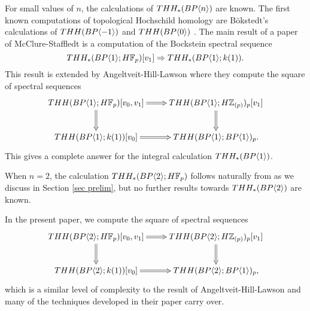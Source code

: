 For small values of $n$, the calculations of $THH_*(BP\langle n \rangle)$ are known. The first known computations of topological Hochschild homology are B\"okstedt's calculations of  $THH(BP\langle -1 \rangle)$ and $THH(BP\langle 0 \rangle)$ \cite{Bok85}. 
The main result of a paper of McClure-Staffledt \cite{McClureStaffeldt} is a computation of the Bockstein spectral sequence 
\[ THH_*(BP\langle 1 \rangle; H\mathbb{F}_p)[v_1]\Rightarrow THH_*(BP\langle 1 \rangle ; k(1) ).\]
This result is extended by Angeltveit-Hill-Lawson \cite{AHL} where they compute the square of spectral sequences 
\[ 
\xymatrix{
THH(\tBP{1}; H\mathbb{F}_p)[v_0,v_1] \ar@{=>}[r] \ar@{=>}[d] & THH(\tBP{1}; H\mathbb{Z}_{(p)})_p[v_1] \ar@{=>}[d] \\
THH(\tBP{1}; k(1))[v_0] \ar@{=>}[r] & THH(\tBP{1};\tBP{1})_p.
}
\]
This gives a complete answer for the integral calculation $THH_*(BP\langle 1 \rangle)$. 


When $n=2$, the calculation $THH_*(BP\langle 2 \rangle;H\mathbb{F}_p)$ follows naturally from \cite{AngeltveitRognes} as we discuss in Section \ref{sec prelim}, but no further results towards $THH_*(BP\langle 2 \rangle)$ are known.

In the present paper, we compute the square of spectral sequences
\[ 
\xymatrix{
THH(\tBP{2}; H\mathbb{F}_p)[v_0,v_1] \ar@{=>}[r] \ar@{=>}[d] & THH(\tBP{2}; H\mathbb{Z}_{(p)})_p[v_1] \ar@{=>}[d] \\
THH(\tBP{2}; k(1))[v_0] \ar@{=>}[r] & THH(\tBP{2};\tBP{1})_p,
}
\]
which is a similar level of complexity to the result of Angeltveit-Hill-Lawson \cite{AHL} and many of the techniques developed in their paper carry over. 

